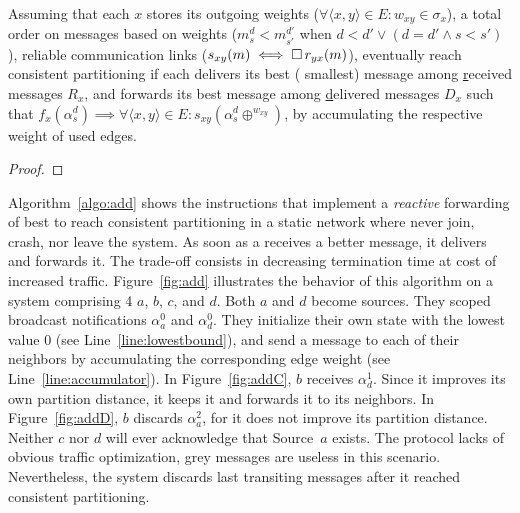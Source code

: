 \begin{theorem}
    Assuming that each \process $x$ stores its outgoing weights
    ($\forall \langle x, y \rangle \in E: w_{xy} \in \sigma_x$), a
    total order on messages based on weights ($m^d_s < m^{d'}_{s'}$
    when $d < d' \vee (d = d' \wedge s< s')$), reliable communication
    links ($s_{xy}(m) \iff \square\, r_{yx}(m)$), \processes eventually reach
    consistent partitioning if each \process delivers its best (\ie
    smallest) message among \underline{r}eceived messages $R_x$, and
    forwards its best message among \underline{d}elivered messages
    $D_x$ such that $f_x(\alpha^d_s) \implies \forall \langle x, y
    \rangle \in E: s_{xy}(\alpha_s^d \oplus ^{w_{xy}})$, \ie by
    accumulating the respective weight of used edges.
\end{theorem}

\begin{proof}
  
\end{proof}




Algorithm~\ref{algo:add} shows the instructions that implement a
\emph{reactive} forwarding of best to reach consistent partitioning in
a static network where \processes never join, crash, nor leave the
system. As soon as a \process receives a better message, it delivers
and forwards it. The trade-off consists in decreasing termination time
at cost of increased traffic.  Figure~\ref{fig:add} illustrates the
behavior of this algorithm on a system comprising 4 \processes $a$,
$b$, $c$, and $d$. Both $a$ and $d$ become sources.  They scoped broadcast
notifications $\alpha_a^0$ and $\alpha_d^0$. They initialize their own
state with the lowest value $0$ (see Line~\ref{line:lowestbound}), and
send a message to each of their neighbors by accumulating the
corresponding edge weight (see Line~\ref{line:accumulator}). In
Figure~\ref{fig:addC}, $b$ receives $\alpha_{d}^{1}$. Since it
improves its own partition distance, it keeps it and forwards it to
its neighbors. In Figure~\ref{fig:addD}, $b$ discards
$\alpha_{a}^{2}$, for it does not improve its partition
distance. Neither $c$ nor $d$ will ever acknowledge that Source~$a$
exists.  The protocol lacks of obvious traffic optimization, \eg grey
messages are useless in this scenario. Nevertheless, the system
discards last transiting messages after it reached consistent
partitioning.

